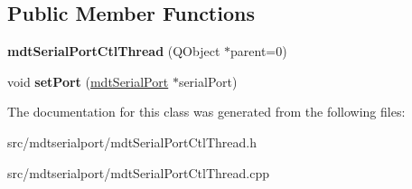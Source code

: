 \subsection*{Public Member Functions}
\begin{DoxyCompactItemize}
\item 
\hypertarget{classmdt_serial_port_ctl_thread_a326a83376c644e8d43224422a6ed4735}{
{\bfseries mdtSerialPortCtlThread} (QObject $\ast$parent=0)}
\label{classmdt_serial_port_ctl_thread_a326a83376c644e8d43224422a6ed4735}

\item 
\hypertarget{classmdt_serial_port_ctl_thread_a0577bf2f8f8f7bbf7c5e39534dcbb55a}{
void {\bfseries setPort} (\hyperlink{classmdt_serial_port}{mdtSerialPort} $\ast$serialPort)}
\label{classmdt_serial_port_ctl_thread_a0577bf2f8f8f7bbf7c5e39534dcbb55a}

\end{DoxyCompactItemize}


The documentation for this class was generated from the following files:\begin{DoxyCompactItemize}
\item 
src/mdtserialport/mdtSerialPortCtlThread.h\item 
src/mdtserialport/mdtSerialPortCtlThread.cpp\end{DoxyCompactItemize}
